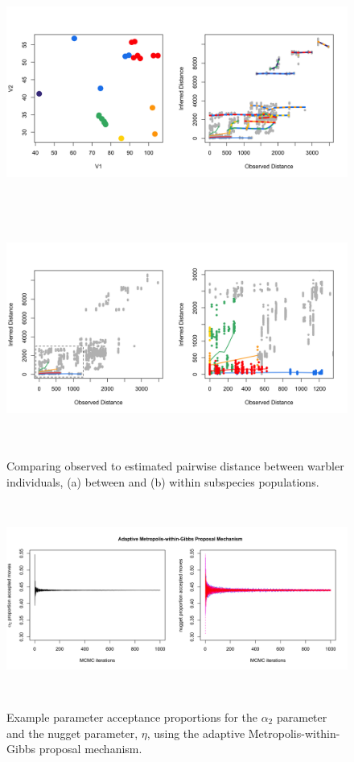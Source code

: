 \documentclass[12pt]{article}
\begin{document}
\begin{figure}
	\centering
			{\includegraphics[width=6in,height=3in]{figs/warblers/warb_ind_dist_compare_allpairs.png}}
			{\includegraphics[width=6in,height=3in]{figs/warblers/warb_ind_dist_compare.png}}
	\caption{Comparing observed to estimated pairwise distance between warbler individuals, (a) between and (b) within subspecies populations.}\label{sfig:warb_ind_distcomp}
\end{figure}


\begin{figure}
\centering
	{\includegraphics[width=6in,height=2.5in]{figs/sims/example_acceptance_rates.png}}
	\caption{Example parameter acceptance proportions for the $\alpha_2$ parameter and the nugget parameter, $\eta$, using the adaptive Metropolis-within-Gibbs proposal mechanism.}\label{sfig:example_acceptance_rates}
\end{figure}
\end{document}
